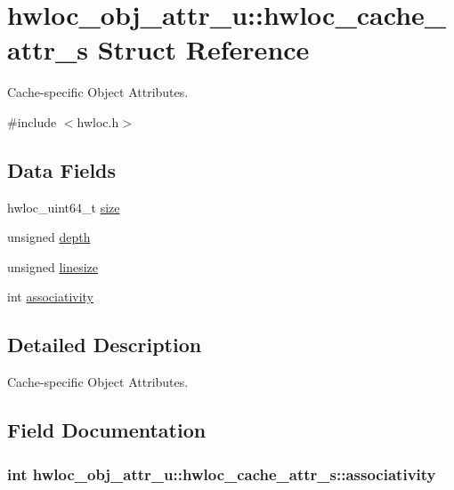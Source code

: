 \hypertarget{a00013}{
\section{hwloc\_\-obj\_\-attr\_\-u::hwloc\_\-cache\_\-attr\_\-s Struct Reference}
\label{a00013}
}


Cache-\/specific Object Attributes.  




{\ttfamily \#include $<$hwloc.h$>$}

\subsection*{Data Fields}
\begin{DoxyCompactItemize}
\item 
hwloc\_\-uint64\_\-t \hyperlink{a00013_abe5e788943ed04302976740c829674c0}{size}
\item 
unsigned \hyperlink{a00013_a5c8f7f39193736c2187ed626940835d5}{depth}
\item 
unsigned \hyperlink{a00013_a801e8a668e28caf06c8b88e9ae5c10db}{linesize}
\item 
int \hyperlink{a00013_ad06525e474d1e2d1423ed71bb998592d}{associativity}
\end{DoxyCompactItemize}


\subsection{Detailed Description}
Cache-\/specific Object Attributes. 

\subsection{Field Documentation}
\hypertarget{a00013_ad06525e474d1e2d1423ed71bb998592d}{
\subsubsection[{associativity}]{\setlength{\rightskip}{0pt plus 5cm}int {\bf hwloc\_\-obj\_\-attr\_\-u::hwloc\_\-cache\_\-attr\_\-s::associativity}}}
\label{a00013_ad06525e474d1e2d1423ed71bb998592d}


